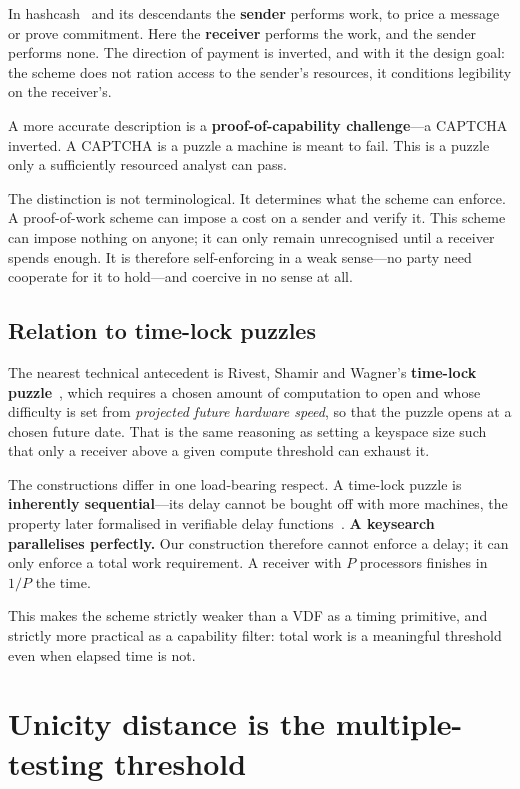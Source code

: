 In hashcash~\cite{hashcash} and its descendants the \textbf{sender} performs
work, to price a message or prove commitment. Here the \textbf{receiver} performs
the work, and the sender performs none. The direction of payment is inverted, and
with it the design goal: the scheme does not ration access to the sender's
resources, it conditions legibility on the receiver's.

A more accurate description is a \textbf{proof-of-capability challenge}---a
CAPTCHA inverted. A CAPTCHA is a puzzle a machine is meant to fail. This is a
puzzle only a sufficiently resourced analyst can pass.

The distinction is not terminological. It determines what the scheme can enforce.
A proof-of-work scheme can impose a cost on a sender and verify it. This scheme
can impose nothing on anyone; it can only remain unrecognised until a receiver
spends enough. It is therefore self-enforcing in a weak sense---no party need
cooperate for it to hold---and coercive in no sense at all.

\subsection{Relation to time-lock puzzles}

The nearest technical antecedent is Rivest, Shamir and Wagner's \textbf{time-lock
puzzle}~\cite{rsw}, which requires a chosen amount of computation to open and
whose difficulty is set from \emph{projected future hardware speed}, so that the
puzzle opens at a chosen future date. That is the same reasoning as setting a
keyspace size such that only a receiver above a given compute threshold can
exhaust it.

The constructions differ in one load-bearing respect. A time-lock puzzle is
\textbf{inherently sequential}---its delay cannot be bought off with more
machines, the property later formalised in verifiable delay
functions~\cite{vdf}. \textbf{A keysearch parallelises perfectly.} Our
construction therefore cannot enforce a delay; it can only enforce a total work
requirement. A receiver with $P$ processors finishes in $1/P$ the time.

This makes the scheme strictly weaker than a VDF as a timing primitive, and
strictly more practical as a capability filter: total work is a meaningful
threshold even when elapsed time is not.

\section{Unicity distance is the multiple-testing threshold}\label{sec:unicity}

